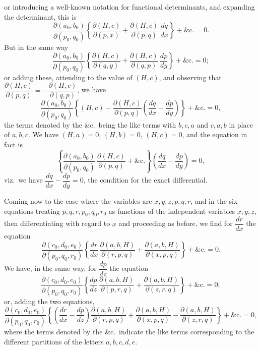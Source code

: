\documentclass[11pt,a4paper]{article}
\begin{document}
\newpage


or introducing a well-known notation for functional determinants, and expanding the determinant, this is
\[
\frac{\partial(a_{0}, b_{0})}{\partial(p_{0}, q_{0})}\!\left\{ \frac{\partial(H, c)}{\partial(p, x)} + \frac{\partial(H, c)}{\partial(p, q)}\,\frac{dq}{dx} \right\} + \&\text{c.} = 0.
\]
But in the same way
\[
\frac{\partial(a_{0}, b_{0})}{\partial(p_{0}, q_{0})}\!\left\{ \frac{\partial(H, c)}{\partial(q, y)} + \frac{\partial(H, c)}{\partial(q, p)}\,\frac{dp}{dy} \right\} + \&\text{c.} = 0;
\]
or adding these, attending to the value of $(H, c)$, and observing that $\dfrac{\partial(H, c)}{\partial(p, q)} = -\dfrac{\partial(H, c)}{\partial(q, p)}$, we have
\[
\frac{\partial(a_{0}, b_{0})}{\partial(p_{0}, q_{0})}\!\left\{ (H, c) - \frac{\partial(H, c)}{\partial(p, q)}\!\left( \frac{dq}{dx} - \frac{dp}{dy} \right) \right\} + \&\text{c.} = 0,
\]
the terms denoted by the \&c.\ being the like terms with $b, c, a$ and $c, a, b$ in place of $a, b, c$. We have $(H, a) = 0$, $(H, b) = 0$, $(H, c) = 0$, and the equation in fact is
\[
\left\{ \frac{\partial(a_{0}, b_{0})}{\partial(p_{0}, q_{0})}\,\frac{\partial(H, c)}{\partial(p, q)} + \&\text{c.} \right\}\!\left( \frac{dq}{dx} - \frac{dp}{dy} \right) = 0,
\]
viz.\ we have $\dfrac{dq}{dx} - \dfrac{dp}{dy} = 0$, the condition for the exact differential.

Coming now to the case where the variables are $x, y, z, p, q, r$, and in the six equations treating $p, q, r, p_{0}, q_{0}, r_{0}$ as functions of the independent variables $x, y, z$, then differentiating with regard to $x$ and proceeding as before, we find for $\dfrac{dr}{dx}$ the equation
\[
\frac{\partial(c_{0}, d_{0}, e_{0})}{\partial(p_{0}, q_{0}, r_{0})}\!\left\{ \frac{dr}{dx}\,\frac{\partial(a, b, H)}{\partial(r, p, q)} + \frac{\partial(a, b, H)}{\partial(x, p, q)} \right\} + \&\text{c.} = 0.
\]
We have, in the same way, for $\dfrac{dp}{dz}$ the equation
\[
\frac{\partial(c_{0}, d_{0}, e_{0})}{\partial(p_{0}, q_{0}, r_{0})}\!\left\{ \frac{dp}{dz}\,\frac{\partial(a, b, H)}{\partial(p, r, q)} + \frac{\partial(a, b, H)}{\partial(z, r, q)} \right\} + \&\text{c.} = 0;
\]
or, adding the two equations,
\[
\frac{\partial(c_{0}, d_{0}, e_{0})}{\partial(p_{0}, q_{0}, r_{0})}\!\left\{ \!\left(\frac{dr}{dx} - \frac{dp}{dz}\right)\frac{\partial(a, b, H)}{\partial(r, p, q)} + \frac{\partial(a, b, H)}{\partial(x, p, q)} - \frac{\partial(a, b, H)}{\partial(z, r, q)} \right\} + \&\text{c.} = 0,
\]
where the terms denoted by the \&c.\ indicate the like terms corresponding to the different partitions of the letters $a, b, c, d, e$.
\end{document}

